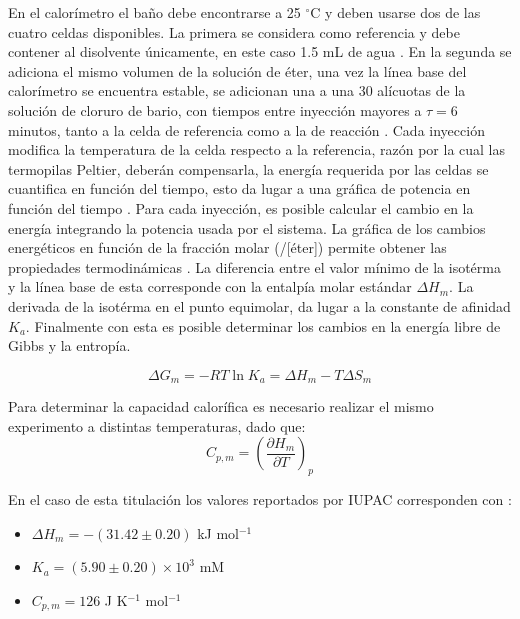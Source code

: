	En el calorímetro el ba\~no debe encontrarse a 25 $^\circ$C y deben usarse dos de las cuatro celdas disponibles. La primera se considera como referencia y debe contener al disolvente únicamente, en este caso 1.5 mL de agua \cite{Suurkuusk}. En la segunda se adiciona el mismo volumen de la solución de éter, una vez la línea base del calorímetro se encuentra estable, se adicionan una a una 30 alícuotas de la solución de cloruro de bario, con tiempos entre inyección mayores a $\tau = 6$ minutos, tanto a la celda de referencia como a la de reacción \cite{mizoue2004calorimetric, duff2011isothermal}. Cada inyección modifica la temperatura de la celda respecto a la referencia, razón por la cual las termopilas Peltier, deberán compensarla, la energía requerida por las celdas se cuantifica en función del tiempo, esto da lugar a una gráfica de potencia en función del tiempo \cite{duff2011isothermal}. Para cada inyección, es posible calcular el cambio en la energía integrando la potencia usada por el sistema. La gráfica de los cambios energéticos en función de la fracción molar (\ce{[Ba^{2+}]}/[éter]) permite obtener  las propiedades termodinámicas \cite{duff2011isothermal, mizoue2004calorimetric}. La diferencia entre el valor mínimo de la isotérma y la línea base de esta corresponde con la entalpía molar estándar $\Delta H_m$. La derivada de la isotérma en el punto equimolar, da lugar a la constante de afinidad $K_a$. Finalmente con esta es posible determinar los cambios en la energía libre de Gibbs y la entropía.
	
	\begin{equation}
		\Delta G_m = -RT\ln K_a = \Delta H_m - T\Delta S_m
	\end{equation}
	
	Para determinar la capacidad calorífica es necesario realizar el mismo experimento a distintas temperaturas, dado que:
	\begin{equation}
		C_{p, m} = \left(\dfrac{\partial H_m}{\partial T}\right)_p
	\end{equation}
	
	En el caso de esta titulación los valores reportados por IUPAC corresponden con \cite{wadso2001standards}:
	\begin{itemize}
		\item $\Delta H_m = -(31.42 \pm 0.20)$ kJ mol$^{-1}$
		\item $K_a = (5.90 \pm 0.20)\times10^3$ mM
		\item $C_{p,m} = 126$ J K$^{-1}$ mol$^{-1}$
	\end{itemize}
	
